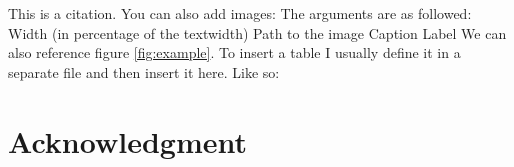 \markdownRendererInterblockSeparator
{}\lipsum[3]\markdownRendererInterblockSeparator
{}\markdownRendererInterblockSeparator
{}\lipsum[3]\markdownRendererInterblockSeparator
{}\markdownRendererInterblockSeparator
{}\lipsum[3]\markdownRendererInterblockSeparator
{}\markdownRendererInterblockSeparator
{}\lipsum[3]\markdownRendererInterblockSeparator
{}\markdownRendererInterblockSeparator
{}\lipsum[3]\markdownRendererInterblockSeparator
{}\markdownRendererInterblockSeparator
{}This is a citation.\cite{Goodfellow.2016}\markdownRendererInterblockSeparator
{}You can also add images:\markdownRendererInterblockSeparator
{}\markdownRendererInterblockSeparator
{}The arguments are as followed:\markdownRendererInterblockSeparator
{}\markdownRendererOlBeginTight
{}Width (in percentage of the textwidth)\markdownRendererOlItemEnd 
{}Path to the image\markdownRendererOlItemEnd 
{}Caption\markdownRendererOlItemEnd 
{}Label\markdownRendererOlItemEnd 
\markdownRendererOlEndTight \markdownRendererInterblockSeparator
{}We can also reference figure \ref{fig:example}.\markdownRendererInterblockSeparator
{}To insert a table I usually define it in a separate file and then insert it here. Like so:\markdownRendererInterblockSeparator
{}\markdownRendererInterblockSeparator
{}\section*{Acknowledgment}\markdownRendererInterblockSeparator
{}\lipsum[1]\relax